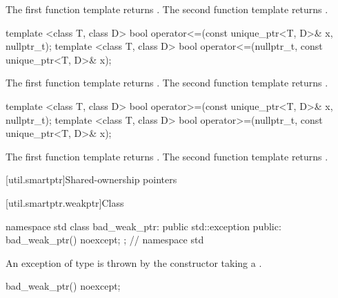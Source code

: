 \begin{itemdescr}
\pnum
\returns
The first function template returns .
The second function template returns .
\end{itemdescr}

%
%
\begin{itemdecl}
template <class T, class D>
  bool operator<=(const unique_ptr<T, D>& x, nullptr_t);
template <class T, class D>
  bool operator<=(nullptr_t, const unique_ptr<T, D>& x);
\end{itemdecl}

\begin{itemdescr}
\pnum
\returns
The first function template returns .
The second function template returns .
\end{itemdescr}

%
%
\begin{itemdecl}
template <class T, class D>
  bool operator>=(const unique_ptr<T, D>& x, nullptr_t);
template <class T, class D>
  bool operator>=(nullptr_t, const unique_ptr<T, D>& x);
\end{itemdecl}

\begin{itemdescr}
\pnum
\returns
The first function template returns .
The second function template returns .
\end{itemdescr}

%
[util.smartptr]{Shared-ownership pointers}

[util.smartptr.weakptr]{Class }
%
%
\begin{codeblock}
namespace std {
  class bad_weak_ptr: public std::exception {
  public:
    bad_weak_ptr() noexcept;
  };
} // namespace std
\end{codeblock}

\pnum
An exception of type  is thrown by the 
constructor taking a .

%
%
%
\begin{itemdecl}
bad_weak_ptr() noexcept;
\end{itemdecl}

